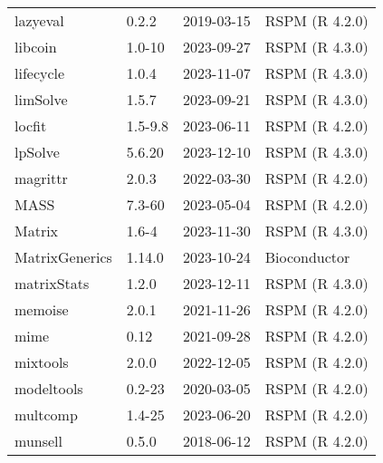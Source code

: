 \begin{tabular}{llll}
lazyeval & 0.2.2 & 2019-03-15 & RSPM (R 4.2.0)\\
libcoin & 1.0-10 & 2023-09-27 & RSPM (R 4.3.0)\\
\addlinespace
lifecycle & 1.0.4 & 2023-11-07 & RSPM (R 4.3.0)\\
limSolve & 1.5.7 & 2023-09-21 & RSPM (R 4.3.0)\\
locfit & 1.5-9.8 & 2023-06-11 & RSPM (R 4.2.0)\\
lpSolve & 5.6.20 & 2023-12-10 & RSPM (R 4.3.0)\\
magrittr & 2.0.3 & 2022-03-30 & RSPM (R 4.2.0)\\
\addlinespace
MASS & 7.3-60 & 2023-05-04 & RSPM (R 4.2.0)\\
Matrix & 1.6-4 & 2023-11-30 & RSPM (R 4.3.0)\\
MatrixGenerics & 1.14.0 & 2023-10-24 & Bioconductor\\
matrixStats & 1.2.0 & 2023-12-11 & RSPM (R 4.3.0)\\
memoise & 2.0.1 & 2021-11-26 & RSPM (R 4.2.0)\\
\addlinespace
mime & 0.12 & 2021-09-28 & RSPM (R 4.2.0)\\
mixtools & 2.0.0 & 2022-12-05 & RSPM (R 4.2.0)\\
modeltools & 0.2-23 & 2020-03-05 & RSPM (R 4.2.0)\\
multcomp & 1.4-25 & 2023-06-20 & RSPM (R 4.2.0)\\
munsell & 0.5.0 & 2018-06-12 & RSPM (R 4.2.0)\\
\end{tabular}
\pagebreak


